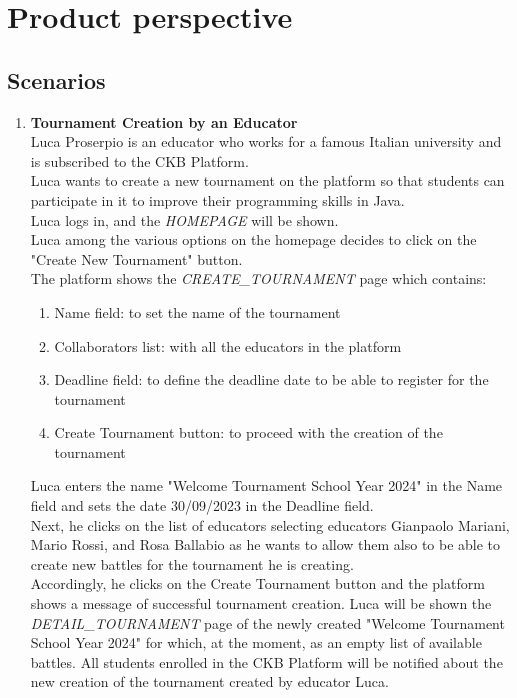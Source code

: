\section{Product perspective}
\subsection{Scenarios}

\begin{enumerate}
      \item \textbf{Tournament Creation by an Educator}\\
    	Luca Proserpio is an educator who works for a famous Italian university and is subscribed to the CKB Platform.\\
    	Luca wants to create a new tournament on the platform so that students can participate in it to improve their programming skills in Java.\\
		Luca logs in, and the \emph{HOMEPAGE} will be shown.\\
		Luca among the various options on the homepage decides to click on the "Create New Tournament" button. \\
		The platform shows the \emph{CREATE\_TOURNAMENT} page which contains:
		
		\begin{enumerate}
			\item Name field: to set the name of the tournament 
			\item Collaborators list: with all the educators in the platform
			\item Deadline field: to define the deadline date to be able to register for the tournament
			\item Create Tournament button: to proceed with the creation of the tournament
		\end{enumerate}
		
		Luca enters the name "Welcome Tournament School Year 2024" in the Name field and sets the date 30/09/2023 in the Deadline field.\\
		Next, he clicks on the list of educators selecting educators Gianpaolo Mariani, Mario Rossi, and Rosa Ballabio as he wants to allow them also to be able to create new
		battles for the tournament he is creating.\\
		Accordingly, he clicks on the Create Tournament button and the platform shows a message of successful tournament creation.
		Luca will be shown the \emph{DETAIL\_TOURNAMENT} page of the newly created "Welcome Tournament School Year 2024" for which, at the moment, as an empty list of
		available
		battles.
		All students enrolled in the CKB Platform will be notified about the new creation of the tournament created by educator Luca.



\end{enumerate}
